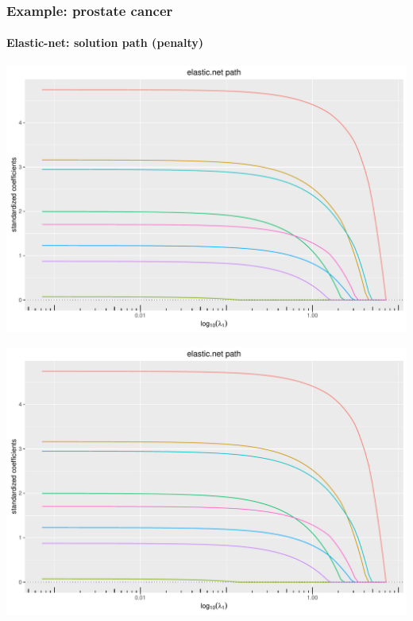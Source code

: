 \documentclass{beamer}\usepackage[]{graphicx}\usepackage[]{color}
\newenvironment{knitrout}{}{} %
\begin{document}
\begin{frame}[containsverbatim]
\frametitle{Example: prostate cancer}
\framesubtitle{Elastic-net: solution path (penalty)}

\begin{knitrout}\scriptsize
{}\color{fgcolor}
\includegraphics[width=\textwidth]{figures/varLasso-unnamed-chunk-82-1} 

\includegraphics[width=\textwidth]{figures/varLasso-unnamed-chunk-82-2} 

\end{knitrout}
\end{frame}
\end{document}
